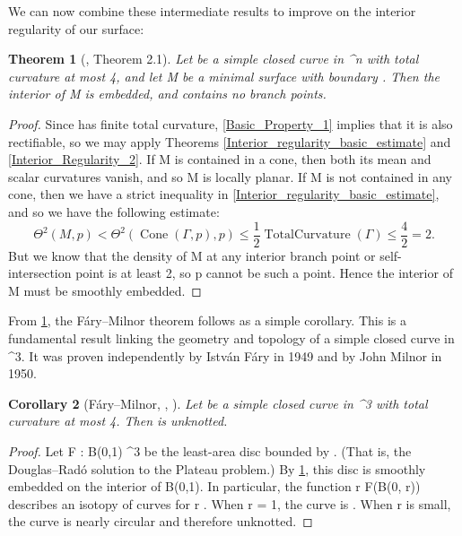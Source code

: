\documentclass[a4paper, 11pt]{article}
\theoremstyle{plain}
\newtheorem{theorem}{Theorem}[section]
\newtheorem{corollary}[theorem]{Corollary}
\theoremstyle{definition}
\theoremstyle{remark}
\numberwithin{equation}{subsection}
\def\({}
\def\){}
\def\pi{}
\begin{document}
We can now combine these intermediate results to improve on the interior regularity of our surface:

\begin{theorem}[\cite{EWW02}, Theorem 2.1]
\label{Interior_Regularity_3}
Let \(\Gamma\) be a simple closed curve in \(^{n}\) with total curvature at most \(4\pi\), and let \(M\) be a minimal surface with boundary \(\Gamma\). Then the interior of \(M\) is embedded, and contains no branch points.
\end{theorem}

\begin{proof}
Since \(\Gamma\) has finite total curvature, \cref{Basic_Property_1} implies that it is also rectifiable, so we may apply Theorems \ref{Interior_regularity_basic_estimate} and \ref{Interior_Regularity_2}. If \(M\) is contained in a cone, then both its mean and scalar curvatures vanish, and so \(M\) is locally planar. If \(M\) is not contained in any cone, then we have a strict inequality in \cref{Interior_regularity_basic_estimate}, and so we have the following estimate:
\begin{equation}
\Theta^{2}(M,p) < \Theta^{2}(\operatorname{Cone}(\Gamma,p),p) \leqslant \frac{1}{2\pi}\operatorname{TotalCurvature}(\Gamma) \leqslant \frac{4\pi}{2\pi} = 2.
\end{equation}
But we know that the density of \(M\) at any interior branch point or self-intersection point is at least \(2\), so \(p\) cannot be such a point. Hence the interior of \(M\) must be smoothly embedded.
\end{proof}

From \cref{Interior_Regularity_3}, the F{\'a}ry--Milnor theorem follows as a simple corollary.  This is a fundamental result linking the geometry and topology of a simple closed curve in \(^{3}\). It was proven independently by Istv{\'a}n F{\'a}ry in 1949 and by John Milnor in 1950.

\begin{corollary}[F{\'a}ry--Milnor, \cite{Far49}, \cite{Mil50}]
Let \(\Gamma\) be a simple closed curve in \(^{3}\) with total curvature at most \(4\pi\). Then \(\Gamma\) is unknotted.
\end{corollary}

\begin{proof}
Let \(F : B(0,1) \rightarrow {}^{3}\) be the least-area disc bounded by \(\Gamma\). (That is, the Douglas--Rad{\'o} solution to the Plateau problem.) By  \cref{Interior_Regularity_3}, this disc is smoothly embedded on the interior of \(B(0,1)\). In particular, the function \(r \mapsto F(\partial B(0, r))\) describes an isotopy of curves for \(r \). When \(r = 1\), the curve is \(\Gamma\). When \(r\) is small, the curve is nearly circular and therefore unknotted.
\end{proof}
\end{document}
